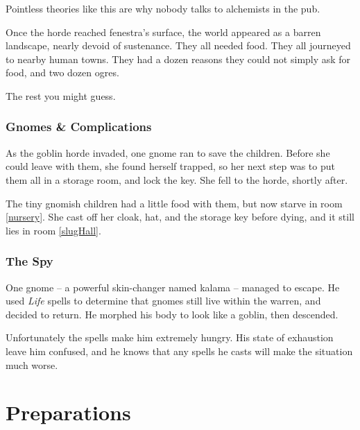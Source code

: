 \begin{multicols}{2}
\begin{exampletext}
{  Pointless theories like this are why nobody talks to alchemists in the pub.}


  Once the horde reached \gls{fenestra}'s surface, the world appeared as a barren landscape, nearly devoid of sustenance.
  They all needed food.
  They all journeyed to nearby human towns.
  They had a dozen reasons they could not simply ask for food, and two dozen ogres.

  The rest you might guess.

\end{exampletext}


\subsubsection{Gnomes \& Complications}
\label{saving_the_children}

\begin{exampletext}
  As the goblin horde invaded, one gnome ran to save the children.
  Before she could leave with them, she found herself trapped, so her next step was to put them all in a storage room, and lock the key.
  She fell to the horde, shortly after.

  The tiny gnomish children had a little food with them, but now starve in room \ref{nursery}.
  She cast off her cloak, hat, and the storage key before dying, and it still lies in room \ref{slugHall}.
\end{exampletext}

\subsubsection{The Spy}
\label{kalama}

\begin{exampletext}
  One gnome -- a powerful skin-changer named \gls{kalama} -- managed to escape.
  He used \textit{Life} spells to determine that gnomes still live within the warren, and decided to return.
  He morphed his body to look like a goblin, then descended.

  Unfortunately the spells make him extremely hungry.
  His state of exhaustion leave him confused, and he knows that any spells he casts will make the situation much worse.
\end{exampletext}

\end{multicols}

\section{Preparations}

